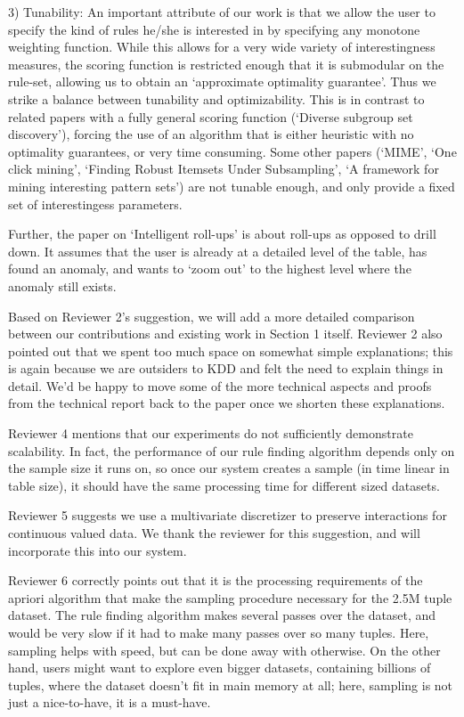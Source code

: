 \documentclass{article}
\begin{document}
3) Tunability: An important attribute of our work is that we allow the user to specify the kind of rules he/she is interested in by specifying any monotone weighting function. While this allows for a very wide variety of interestingness measures, the scoring function is restricted enough that it is submodular on the rule-set, allowing us to obtain an `approximate optimality guarantee'. Thus we strike a balance between tunability and optimizability. This is in contrast to related papers with a fully general scoring function (`Diverse subgroup set discovery'), forcing the use of an algorithm that is either heuristic with no optimality guarantees, or very time consuming. Some other papers (`MIME', `One click mining', `Finding Robust Itemsets Under Subsampling', `A framework for mining interesting pattern sets') are not tunable enough, and only provide a fixed set of interestingess parameters.

Further, the paper on `Intelligent roll-ups' is about roll-ups as opposed to drill down. It assumes that the user is already at a detailed level of the table, has found an anomaly, and wants to `zoom out' to the highest level where the anomaly still exists.

Based on Reviewer 2's suggestion, we will add a more detailed comparison between our contributions and existing work in Section 1 itself. Reviewer 2 also pointed out that we spent too much space on somewhat simple explanations;
this is again because we are outsiders to KDD and felt the need to explain things in detail. We'd be happy to move some of the more technical aspects and proofs from the technical report back to the paper once we shorten these explanations.

Reviewer 4 mentions that our experiments do not sufficiently demonstrate scalability. In fact, the performance of our rule finding algorithm depends only on the sample size it runs on, so once our system creates a sample (in time linear in table size), it should have the same processing time for different sized datasets.

Reviewer 5 suggests we use a multivariate discretizer to preserve interactions for continuous valued data. We thank the reviewer for this suggestion, and will incorporate this into our system.

Reviewer 6 correctly points out that it is the processing requirements of the apriori algorithm that make the sampling procedure necessary for the 2.5M tuple dataset. The rule finding algorithm makes several passes over the dataset, and would be very slow if it had to make many passes over so many tuples. Here, sampling helps with speed, but can be done away with otherwise. On the other hand, users might want to explore even bigger datasets, containing billions of tuples, where the dataset doesn't fit in main memory at all; here, sampling is not just a nice-to-have, it is a must-have.
\end{document}
